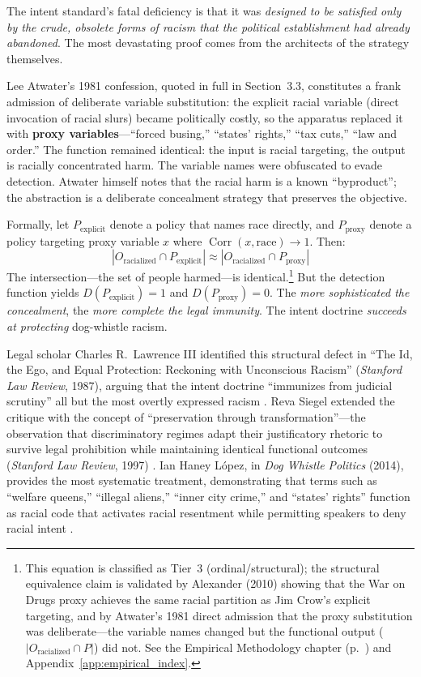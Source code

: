 The intent standard's fatal deficiency is that it was \textit{designed to be satisfied only by the crude, obsolete forms of racism that the political establishment had already abandoned}. The most devastating proof comes from the architects of the strategy themselves.

Lee Atwater's 1981 confession, quoted in full in Section~3.3, constitutes a frank admission of deliberate variable substitution: the explicit racial variable (direct invocation of racial slurs) became politically costly, so the apparatus replaced it with \textbf{proxy variables}---``forced busing,'' ``states' rights,'' ``tax cuts,'' ``law and order.'' The function remained identical: the input is racial targeting, the output is racially concentrated harm. The variable names were obfuscated to evade detection. Atwater himself notes that the racial harm is a known ``byproduct''; the abstraction is a deliberate concealment strategy that preserves the objective.

Formally, let $P_{\text{explicit}}$ denote a policy that names race directly, and $P_{\text{proxy}}$ denote a policy targeting proxy variable $x$ where $\operatorname{Corr}(x, \text{race}) \to 1$. Then:
\begin{equation}\label{eq:12.4-proxy-discrimination-equivalence}
|O_{\text{racialized}} \cap P_{\text{explicit}}| \approx |O_{\text{racialized}} \cap P_{\text{proxy}}|
\end{equation}
The intersection---the set of people harmed---is identical.\footnote{This equation is classified as Tier~3 (ordinal/structural); the structural equivalence claim is validated by Alexander (2010) showing that the War on Drugs proxy achieves the same racial partition as Jim Crow's explicit targeting, and by Atwater's 1981 direct admission that the proxy substitution was deliberate---the variable names changed but the functional output ($|O_{\text{racialized}} \cap P|$) did not. See the Empirical Methodology chapter (p.~\pageref{ch:empirical_methodology}) and Appendix~\ref{app:empirical_index}.} But the detection function yields $D(P_{\text{explicit}}) = 1$ and $D(P_{\text{proxy}}) = 0$. The \textit{more sophisticated the concealment}, the \textit{more complete the legal immunity}. The intent doctrine \textit{succeeds at protecting} dog-whistle racism.

Legal scholar Charles R.\ Lawrence III identified this structural defect in ``The Id, the Ego, and Equal Protection: Reckoning with Unconscious Racism'' (\textit{Stanford Law Review}, 1987), arguing that the intent doctrine ``immunizes from judicial scrutiny'' all but the most overtly expressed racism \cite{tel_lawrence}. Reva Siegel extended the critique with the concept of ``preservation through transformation''---the observation that discriminatory regimes adapt their justificatory rhetoric to survive legal prohibition while maintaining identical functional outcomes (\textit{Stanford Law Review}, 1997) \cite{tel_siegel}. Ian Haney L\'{o}pez, in \textit{Dog Whistle Politics} (2014), provides the most systematic treatment, demonstrating that terms such as ``welfare queens,'' ``illegal aliens,'' ``inner city crime,'' and ``states' rights'' function as racial code that activates racial resentment while permitting speakers to deny racial intent \cite{lopez}.


